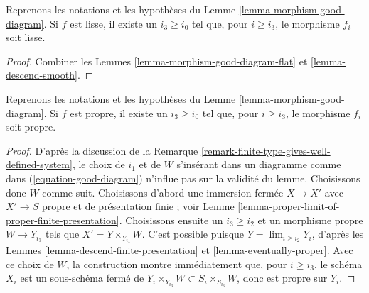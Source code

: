 \begin{lemma}
\label{lemma-morphism-good-diagram-smooth}
Reprenons les notations et les hypothèses du Lemme \ref{lemma-morphism-good-diagram}.
Si $f$ est lisse, il existe un $i_3 \geq i_0$ tel que, pour
$i \geq i_3$, le morphisme $f_i$ soit lisse.
\end{lemma}

\begin{proof}
Combiner les Lemmes \ref{lemma-morphism-good-diagram-flat} et
\ref{lemma-descend-smooth}.
\end{proof}

\begin{lemma}
\label{lemma-morphism-good-diagram-proper}
Reprenons les notations et les hypothèses du Lemme \ref{lemma-morphism-good-diagram}.
Si $f$ est propre, il existe un $i_3 \geq i_0$ tel que, pour
$i \geq i_3$, le morphisme $f_i$ soit propre.
\end{lemma}

\begin{proof}
D'après la discussion de la
Remarque \ref{remark-finite-type-gives-well-defined-system},
le choix de $i_1$ et de $W$ s'insérant dans un diagramme comme dans
(\ref{equation-good-diagram}) n'influe pas sur la validité
du lemme. Choisissons donc $W$ comme suit.
Choisissons d'abord une immersion fermée $X \to X'$
avec $X' \to S$ propre et de présentation finie ; voir
Lemme \ref{lemma-proper-limit-of-proper-finite-presentation}.
Choisissons ensuite un $i_3 \geq i_2$ et un morphisme propre $W \to Y_{i_3}$
tels que $X' = Y \times_{Y_{i_3}} W$. C'est possible puisque
$Y = \lim_{i \geq i_2} Y_i$, d'après les
Lemmes \ref{lemma-descend-finite-presentation} et
\ref{lemma-eventually-proper}.
Avec ce choix de $W$, la construction montre immédiatement que,
pour $i \geq i_3$, le schéma $X_i$ est un sous-schéma fermé de
$Y_i \times_{Y_{i_3}} W \subset S_i \times_{S_{i_3}} W$,
donc est propre sur $Y_i$.
\end{proof}

